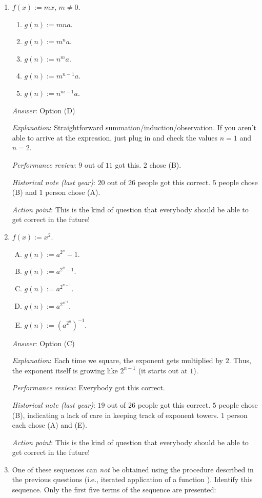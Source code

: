 \documentclass[10pt]{amsart}
\begin{document}
\begin{enumerate}
\item $f(x) := mx$, $m \ne 0$.
  \begin{enumerate}
  \item $g(n) := mna$.
  \item $g(n) := m^na$.
  \item $g(n) := n^ma$.
  \item $g(n) := m^{n-1}a$.
  \item $g(n) := n^{m-1}a$.
  \end{enumerate}

  {\em Answer}: Option (D)

  {\em Explanation}: Straightforward
  summation/induction/observation. If you aren't able to arrive at the
  expression, just plug in and check the values $n = 1$ and $n = 2$.

  {\em Performance review}: $9$ out of $11$ got this. $2$ chose (B).

  {\em Historical note (last year)}: $20$ out of $26$ people got this
  correct. $5$ people chose (B) and $1$ person chose (A).

  {\em Action point}: This is the kind of question that everybody
  should be able to get correct in the future!
\item $f(x) := x^2$.
  \begin{enumerate}[(A)]
  \item $g(n) := a^{2^n} - 1$.
  \item $g(n) := a^{2^n - 1}$.
  \item $g(n) := a^{2^{n-1}}$.
  \item $g(n) := a^{2^{n^{-1}}}$.
  \item $g(n) := (a^{2^n})^{-1}$.
  \end{enumerate}

  {\em Answer}: Option (C)

  {\em Explanation}: Each time we square, the exponent gets multiplied
  by $2$. Thus, the exponent itself is growing like $2^{n-1}$ (it
  starts out at $1$).

  {\em Performance review}: Everybody got this correct.

  {\em Historical note (last year)}: $19$ out of $26$ people got this
  correct. $5$ people chose (B), indicating a lack of care in keeping
  track of exponent towers. $1$ person each chose (A) and (E).

  {\em Action point}: This is the kind of question that everybody
  should be able to get correct in the future!

\item One of these sequences can {\em not} be obtained using the
  procedure described in the previous questions (i.e., iterated
  application of a function ). Identify this sequence. Only the first
  five terms of the sequence are presented:


\end{enumerate}
\end{document}
